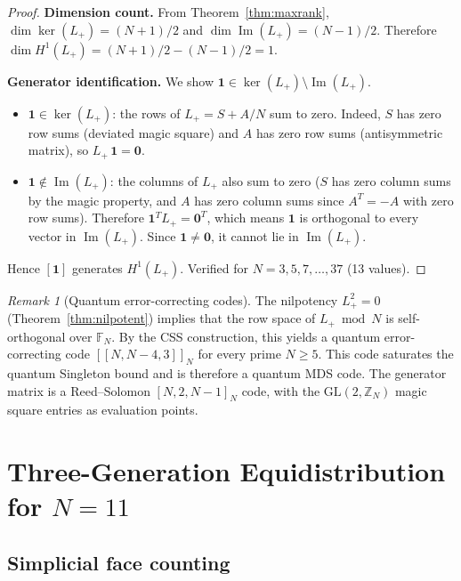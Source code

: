 \documentclass[aip,jmp,reprint,superscriptaddress,floatfix,nofootinbib]{revtex4-2}
\theoremstyle{definition}
\theoremstyle{remark}
\newtheorem{remark}[theorem]{Remark}
\begin{document}
\begin{proof}
\textbf{Dimension count.}  From Theorem~\ref{thm:maxrank},
$\dim\ker(L_+) = (N{+}1)/2$ and $\dim\operatorname{Im}(L_+) = (N{-}1)/2$.
Therefore $\dim H^1(L_+) = (N{+}1)/2 - (N{-}1)/2 = 1$.

\medskip\noindent
\textbf{Generator identification.}  We show
$\mathbf{1} \in \ker(L_+) \setminus \operatorname{Im}(L_+)$.
\begin{itemize}
\item $\mathbf{1} \in \ker(L_+)$: the rows of $L_+ = S + A/N$ sum to
zero.  Indeed, $S$ has zero row sums (deviated magic square) and $A$
has zero row sums (antisymmetric matrix), so
$L_+\,\mathbf{1} = \mathbf{0}$.

\item $\mathbf{1} \notin \operatorname{Im}(L_+)$: the columns of $L_+$
also sum to zero ($S$ has zero column sums by the magic property, and
$A$ has zero column sums since $A^T = -A$ with zero row sums).
Therefore $\mathbf{1}^T L_+ = \mathbf{0}^T$, which means
$\mathbf{1}$ is orthogonal to every vector in $\operatorname{Im}(L_+)$.
Since $\mathbf{1} \neq \mathbf{0}$, it cannot lie in
$\operatorname{Im}(L_+)$.
\end{itemize}
Hence $[\mathbf{1}]$ generates $H^1(L_+)$.
Verified for $N = 3, 5, 7, \ldots, 37$ (13 values).
\end{proof}

\begin{remark}[Quantum error-correcting codes]
\label{rem:qec}
The nilpotency $L_+^2 = 0$ (Theorem~\ref{thm:nilpotent})
implies that the row space of $L_+ \bmod N$ is self-orthogonal over $\mathbb{F}_N$.
By the CSS construction, this yields a quantum error-correcting code
$[[N, N-4, 3]]_N$ for every prime $N \geq 5$.
This code saturates the quantum Singleton bound and is therefore
a quantum MDS code.
The generator matrix is a Reed--Solomon $[N,2,N-1]_N$ code,
with the $\mathrm{GL}(2,\mathbb{Z}_N)$ magic square entries as evaluation points.
\end{remark}

\section{Three-Generation Equidistribution for \texorpdfstring{$N=11$}{N=11}}
\label{sec:three-gen}

\subsection{Simplicial face counting}
\end{document}
